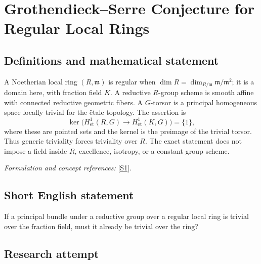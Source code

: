 \documentclass[11pt,a4paper]{article}
\newcommand{\sref}[2]{\hyperlink{source:#1:#2}{[S#2]}}
\newif\ifshowcatalogue
\newcommand{\cataloguescope}[1]{\ifshowcatalogue
 \paragraph{Exact scope in the supplied catalogue.}
 \begin{quote}\small #1\end{quote}\fi}
\numberwithin{equation}{section}
\begin{document}
\setcounter{section}{0}
\clearpage
\section*{\texorpdfstring{Grothendieck–Serre Conjecture for Regular Local Rings}{Grothendieck–Serre Conjecture for Regular Local Rings}}\label{statement}
\subsection{Definitions and mathematical statement}
A Noetherian local ring $(R,\mathfrak m)$ is regular when
$\dim R=\dim_{R/\mathfrak m}\mathfrak m/\mathfrak m^2$; it is a domain here, with fraction field $K$. A reductive $R$-group scheme is smooth affine with connected reductive geometric fibers. A $G$-torsor is a principal homogeneous space locally trivial for the \"etale topology. The assertion is
\[
 \ker\bigl(H^1_{\mathrm{et}}(R,G)\to H^1_{\mathrm{et}}(K,G)\bigr)=\{1\},
\]
where these are pointed sets and the kernel is the preimage of the trivial torsor. Thus generic triviality forces triviality over $R$. The exact statement does not impose a field inside $R$, excellence, isotropy, or a constant group scheme.
\par\smallskip\textit{Formulation and concept references:} \sref{statement}{1}.
\cataloguescope{For every commutative Noetherian regular local ring R, with fraction field K=Frac(R), and every reductive R-group scheme G (smooth affine with connected reductive geometric fibers), every G-torsor over Spec(R) that becomes trivial over Spec(K) is already trivial over Spec(R). Equivalently, the natural map of nonabelian pointed sets H\textasciicircum{}1\_et(R,G) -> H\textasciicircum{}1\_et(K,G) has trivial kernel. Regular local rings here are domains. No field-containing, excellence, finite-type, unramified, quasi-split, isotropic or constant-group restriction is imposed.}
\subsection{Short English statement}
If a principal bundle under a reductive group over a regular local ring is trivial over the fraction field, must it already be trivial over the ring?
\subsection{Research attempt}
\end{document}
